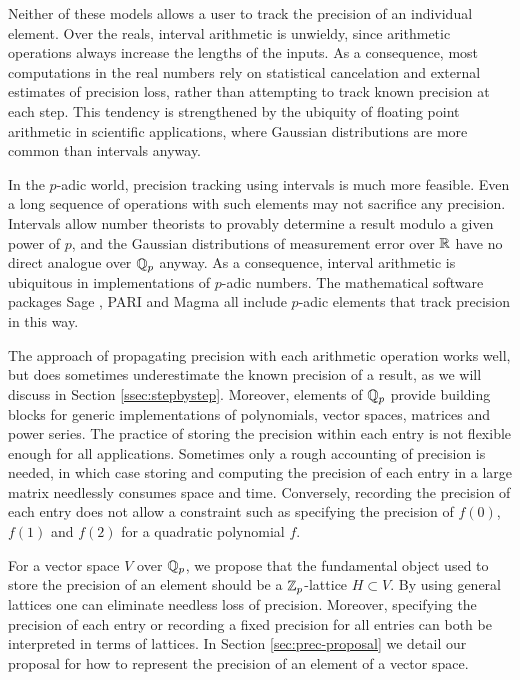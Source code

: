 \documentclass{lms}
\begin{document}
Neither of these models allows a user to track the precision of an individual element.
Over the reals, interval arithmetic is unwieldy, since arithmetic operations always increase the lengths of the inputs.
As a consequence, most computations in the real numbers rely on
statistical cancelation and external estimates of precision loss, rather than
attempting to track known precision at each step.  This tendency is strengthened
by the ubiquity of floating point arithmetic in scientific applications, where Gaussian
distributions are more common than intervals anyway.

In the $p$-adic world, precision tracking using intervals is much more feasible.
Even a long sequence of operations with such elements may not sacrifice any precision.  Intervals
allow number theorists to provably determine a result modulo a given power of $p$,
and the Gaussian distributions of measurement error over $\mathbb R$ have no direct analogue
over $\mathbb Q_p$ anyway.  As a consequence, interval arithmetic is ubiquitous
in implementations of $p$-adic numbers.  The mathematical software packages
Sage \cite{sage}, PARI \cite{pari} and Magma \cite{magma} all include $p$-adic elements
that track precision in this way.

The approach of propagating precision with each arithmetic operation works well, but does
sometimes underestimate the known precision of a result, as we will discuss in Section
\ref{ssec:stepbystep}.  Moreover, elements of $\mathbb Q_p$ provide building blocks for generic
implementations of polynomials, vector spaces, matrices and power series.  The practice
of storing the precision within each entry is not flexible enough for all applications.
Sometimes only a rough accounting of precision is needed, in which case storing
and computing the precision of each entry in a large matrix needlessly consumes
space and time.  Conversely, recording the precision of each entry does not allow
a constraint such as specifying the precision of $f(0)$, $f(1)$ and $f(2)$ for a
quadratic polynomial $f$.

For a vector space $V$ over $\mathbb Q_p$, we propose that the fundamental object used to
store the precision of an element should be a $\mathbb Z_p$-lattice $H \subset V$.  By using
general lattices one can eliminate needless loss of precision.  Moreover, specifying
the precision of each entry or recording a fixed precision for all entries can both
be interpreted in terms of lattices.  In Section \ref{sec:prec-proposal} we detail our
proposal for how to represent the precision of an element of a vector space.
\end{document}

